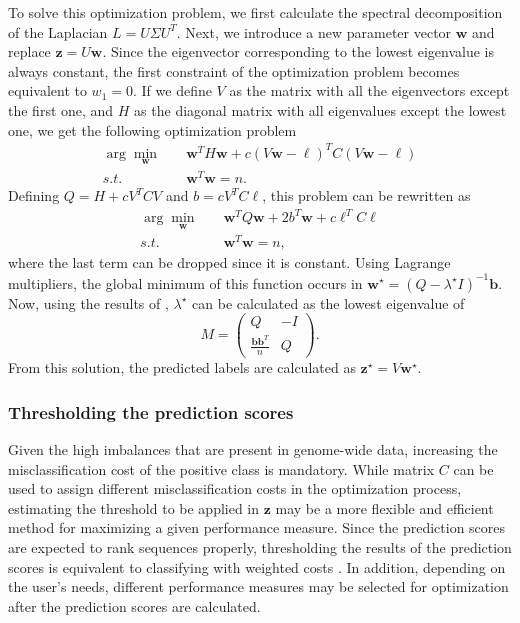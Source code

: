 \documentclass{article}
\newcommand*\Bell{\ensuremath{\boldsymbol\ell}}
\begin{document}
To solve this optimization problem, we first calculate the spectral decomposition of the Laplacian $L = U \Sigma U^T$. Next, we introduce a new parameter vector $\mathbf{w}$ and replace $\mathbf{z} = U \mathbf{w}$. Since the eigenvector corresponding to the lowest eigenvalue is always constant, the first constraint of the optimization problem becomes equivalent to $w_{1}=0$. If we define $V$ as the matrix with all the eigenvectors except the first one, and $H$ as the diagonal matrix with all eigenvalues except the lowest one, we get the following optimization problem
\begin{equation}
	\begin{split}
		\arg\min_{\mathbf{w}} & \quad \mathbf{w}^T H \mathbf{w} + c (V \mathbf{w} - \Bell)^T C (V \mathbf{w} - \Bell) \\
		s.t. & \quad \mathbf{w}^T \mathbf{w} = n.
	\end{split}
\end{equation}
\noindent Defining $Q = H + c V^T C V$ and $b = c V^T C \Bell$, this problem can be rewritten as
\begin{equation}
	\begin{split}
		\arg\min_{\mathbf{w}} &\quad \mathbf{w}^T Q \mathbf{w} + 2 b^T \mathbf{w} + c \Bell^T C \Bell \\
		s.t. &\quad \mathbf{w}^T \mathbf{w} = n,
	\end{split}
\end{equation}
\noindent where the last term can be dropped since it is constant. Using Lagrange multipliers, the global minimum of this function occurs in $\mathbf{w}^\star = (Q - \lambda^\star I)^{-1} \mathbf{b}$. Now, using the results of \citep{gander1989constrained}, $\lambda^\star$ can be calculated as the lowest eigenvalue of
\begin{equation}
	M = \left( \begin{array}{cc}
			Q & -I \\
	\frac{{\mathbf{b} \mathbf{b}^T}}{{n}} & Q \end{array} \right).
\end{equation}
From this solution, the predicted labels are calculated as $\mathbf{z}^\star = V \mathbf{w}^\star$.

\subsubsection{Thresholding the prediction scores}
Given the high imbalances that are present in genome-wide data, increasing the misclassification cost of the positive class is mandatory. While matrix $C$ can be used to assign different misclassification costs in the optimization process, estimating the threshold to be applied in $\mathbf{z}$ may be a more flexible and efficient method for maximizing a given performance measure. Since the prediction scores are expected to rank sequences properly, thresholding the results of the prediction scores is equivalent to classifying with weighted costs \citep{mease2007boosted}. In addition, depending on the user's needs, different performance measures may be selected for optimization after the prediction scores are calculated.
\end{document}
